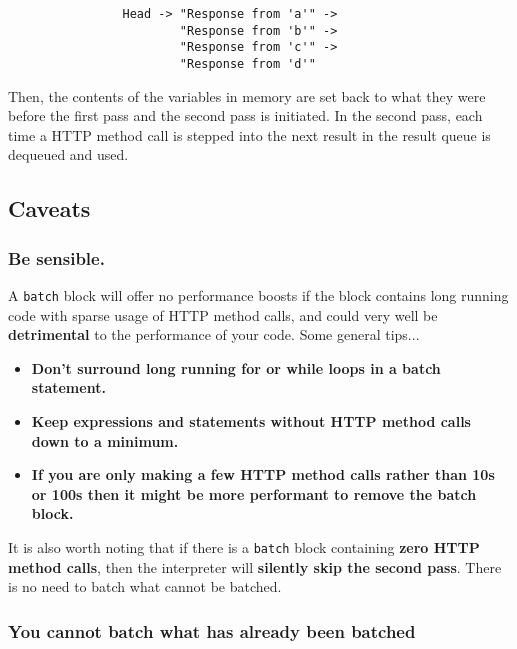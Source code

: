 \documentclass[12pt, letterpaper]{article}
\begin{document}
\begin{center}
    \begin{verbatim}
                Head -> "Response from 'a'" ->
                        "Response from 'b'" ->
                        "Response from 'c'" ->
                        "Response from 'd'"
    \end{verbatim}
\end{center}

Then, the contents of the variables in memory are set back to what they were before the first pass and the second pass is initiated. In the second pass, each time a HTTP method call is stepped into the next result in the result queue is dequeued and used.

\subsection{Caveats}

\subsubsection{Be sensible.}

A \verb|batch| block will offer no performance boosts if the block contains long running code with sparse usage of HTTP method calls, and could very well be \textbf{detrimental} to the performance of your code. Some general tips...

\begin{itemize}
    \item \textbf{Don't surround long running for or while loops in a batch statement.}
    \item \textbf{Keep expressions and statements without HTTP method calls down to a minimum.}
    \item \textbf{If you are only making a few HTTP method calls rather than 10s or 100s then it might be more performant to remove the batch block.}
\end{itemize}

It is also worth noting that if there is a \verb|batch| block containing \textbf{zero HTTP method calls}, then the interpreter will \textbf{silently skip the second pass}. There is no need to batch what cannot be batched.

\subsubsection{You cannot batch what has already been batched}
\end{document}
